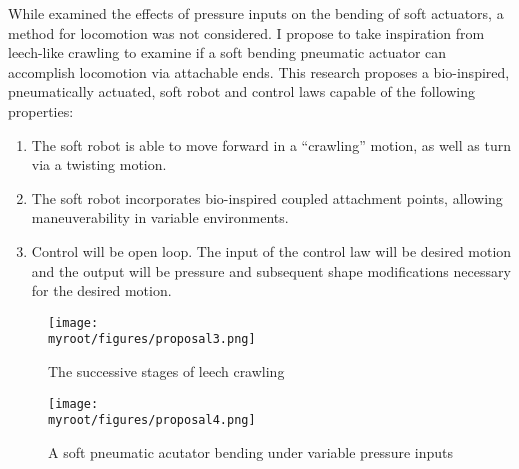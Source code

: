 \documentclass{IEEEtran}
\newcommand{\myroot}{../}
\begin{document}
While \cite{polygerinos2015modeling} examined the effects of pressure inputs on the bending of soft actuators, a method for locomotion was not considered.  I propose to take inspiration from leech-like crawling to examine if a soft bending pneumatic actuator can accomplish locomotion via attachable ends.  This research proposes a bio-inspired, pneumatically actuated, soft robot and control laws capable of the following properties:
\begin{enumerate}
\item The soft robot is able to move forward in a ``crawling'' motion, as well as turn via a twisting motion.
\item The soft robot incorporates bio-inspired coupled attachment points, allowing maneuverability in variable environments.
\item Control will be open loop.  The input of the control law will be desired motion and the output will be pressure and subsequent shape modifications necessary for the desired motion.
\end{enumerate}

\begin{figure}
\caption{The successive stages of leech crawling \cite{kristan2005neuronal}}
\label{f3}
\begin{center}
\texttt{[image: \\myroot/figures/proposal3.png]}
\end{center}
\end{figure}

\begin{figure}
\caption{A soft pneumatic acutator bending under variable pressure inputs \cite{polygerinos2015modeling}}
\label{f4}
\begin{center}
\texttt{[image: \\myroot/figures/proposal4.png]}
\end{center}
\end{figure}
\end{document}
